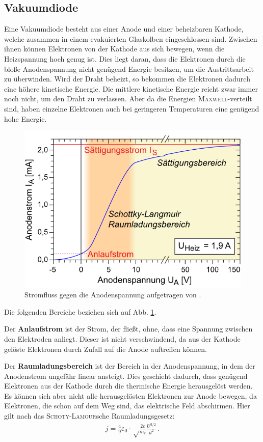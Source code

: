 \documentclass[12pt,a4paper,titlepage,headinclude,bibtotoc]{scrartcl}
\begin{document}
\subsection{Vakuumdiode}
Eine Vakuumdiode besteht aus einer Anode und einer beheizbaren Kathode, welche zusammen in einem evakuierten Glaskolben eingeschlossen sind.
Zwischen ihnen können Elektronen von der Kathode aus sich bewegen, wenn die Heizspannung hoch genug ist.
Dies liegt daran, dass die Elektronen durch die bloße Anodenspannung nicht genügend Energie besitzen, um die Austrittsarbeit zu überwinden.
Wird der Draht beheizt, so bekommen die Elektronen dadurch eine höhere kinetische Energie.
Die mittlere kinetische Energie reicht zwar immer noch nicht, um den Draht zu verlassen.
Aber da die Energien \textsc{Maxwell}-verteilt sind, haben einzelne Elektronen auch bei geringeren Temperaturen eine genügend hohe Energie.\\
\begin{figure}[!h]
\centering
\includegraphics{stromfluss}
\caption{Stromfluss gegen die Anodenspannung aufgetragen von \cite[8.10.14, 12 Uhr]{LP17}.}
\label{fig:strombild}
\end{figure}

Die folgenden Bereiche beziehen sich auf Abb. \ref{fig:strombild}.

Der \textbf{Anlaufstrom} ist der Strom, der fließt, ohne, dass eine Spannung zwischen den Elektroden anliegt.
Dieser ist nicht verschwindend, da aus der Kathode gelöste Elektronen durch Zufall auf die Anode auftreffen können.

Der \textbf{Raumladungsbereich} ist der Bereich in der Anodenspannung, in dem der Anodenstrom ungefähr linear ansteigt.
Dies geschieht dadurch, dass genügend Elektronen aus der Kathode durch die thermische Energie herausgelöst werden.
Es können sich aber nicht alle herausgelösten Elektronen zur Anode bewegen, da Elektronen, die schon auf dem Weg sind, das elektrische Feld abschirmen.
Hier gilt nach \cite[S. 475]{gerthsen} das \textsc{Schoty-Lamour}sche Raumladungsgesetz:
\begin{align}
j=\frac{4}{9}\varepsilon_0\cdot\sqrt\frac{2e}{m_e}\frac{U^{3/2}}{d^2}\, .\label{eq:rauml}
\end{align}
\end{document}
